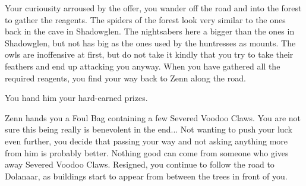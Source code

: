 Your curiousity arroused by the offer, you wander off the road and into the forest to gather the reagents. The spiders of the forest look very similar to the ones back in the cave in Shadowglen. The nightsabers here a bigger than the ones in Shadowglen, but not has big as the ones used by the huntresses as mounts. The owls are inoffensive at first, but do not take it kindly that you try to take their feathers and end up attacking you anyway. When you have gathered all the required reagents, you find your way back to Zenn along the road. %


You hand him your hard-earned prizes.


Zenn hands you a Foul Bag containing a few Severed Voodoo Claws. You are not sure this being really is benevolent in the end... Not wanting to push your luck even further, you decide that passing your way and not asking anything more from him is probably better. Nothing good can come from someone who gives away Severed Voodoo Claws. Resigned, you continue to follow the road to Dolanaar, as buildings start to appear from between the trees in front of you.
